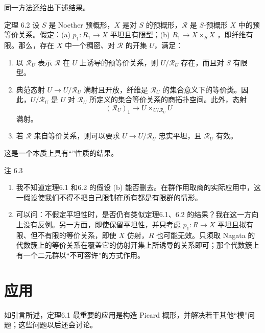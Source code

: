 同一方法还给出下述结果。
\begin{statement}{定理 6.2}
设 $S$ 是 Noether 预概形，$X$ 是对 $S$ 的预概形，$\mathcal R$ 是 $S$-预概形 $X$ 中的预等价关系。假定：(a) $p_1:R_1\to X$ 平坦且有限型；(b) $R_1\to X\times_SX$ ，即纤维有限。那么，存在 $X$ 中一个稠密、对 $\mathcal R$ 的开集 $U$，满足：
\begin{enumerate}[label=(\roman*)]
 \item 以 $\mathcal R_U$ 表示 $\mathcal R$ 在 $U$ 上诱导的预等价关系，则 $U/\mathcal R_U$ 存在，而且对 $S$ 有限型。
 \item 典范态射 $U\to U/\mathcal R_U$ 满射且开放，纤维是 $\mathcal R_U$ 的集合意义下的等价类。因此，$U/\mathcal R_U$ 是 $U$ 对 $\mathcal R_U$ 所定义的集合等价关系的商拓扑空间。此外，态射
 \[
  (\mathcal R_U)_1\longrightarrow U\times_{U/\mathcal R_U}U
 \]
 满射。
 \item 若 $\mathcal R$ 来自等价关系，则可以要求 $U\to U/\mathcal R_U$ 忠实平坦，且 $\mathcal R_U$ 有效。
\end{enumerate}
\end{statement}

这是一个本质上具有“”性质的结果。

\begin{statement}{注 6.3}
\begin{enumerate}[label=\arabic*\textsuperscript{o}]
 \item 我不知道定理6.1 和6.2 的假设 (b) 能否删去。在群作用取商的实际应用中，这一假设使我们不得不把自己限制在所有都是有限群的情形。
 \item 可以问：不假定平坦性时，是否仍有类似定理6.1、6.2 的结果？我在这一方向上没有反例。另一方面，即使保留平坦性，并只考虑 $p_1:R\to X$ 平坦且拟有限、但不有限的等价关系，即使 $X$ 仿射，$R$ 也可能无效。只须取 Nagata 的代数簇上的等价关系在覆盖它的仿射开集上所诱导的关系即可；那个代数簇上有一个二元群以“不可容许”的方式作用。
\end{enumerate}
\end{statement}

\section{应用}
如引言所述，定理6.1 最重要的应用是构造 Picard 概形，并解决若干其他“模”问题；这些问题以后还会讨论。

